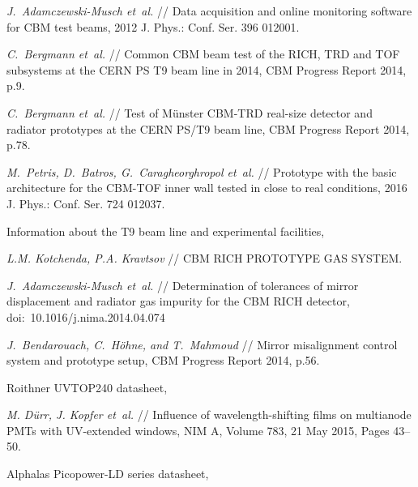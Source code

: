 \begin{thebibliography}{99}
\textit{J.~Adamczewski-Musch et~al.} //
Data acquisition and online monitoring software for CBM test beams,
2012 J. Phys.: Conf. Ser. 396 012001.

\textit{C.~Bergmann et~al.} //
Common CBM beam test of the RICH, TRD and TOF subsystems at the CERN PS T9 beam line in 2014,
CBM Progress Report 2014, p.9.

\textit{C.~Bergmann et~al.} //
Test of M\"unster CBM-TRD real-size detector and radiator prototypes at the CERN PS/T9 beam line,
CBM Progress Report 2014, p.78.

\textit{M.~Petris, D.~Batros, G.~Caragheorghropol et~al.} //
Prototype with the basic architecture for the CBM-TOF inner wall tested in close to real conditions,
2016 J. Phys.: Conf. Ser. 724 012037.

Information about the T9 beam line and experimental facilities,

\textit{L.M. Kotchenda, P.A. Kravtsov} //
CBM RICH PROTOTYPE GAS SYSTEM.

\textit{J.~Adamczewski-Musch et~al.} //
Determination of tolerances of mirror displacement and radiator gas impurity for the CBM RICH detector,
doi:~10.1016/j.nima.2014.04.074

\textit{J.~Bendarouach, C.~H\"{o}hne, and T.~Mahmoud} //
Mirror misalignment control system and prototype setup,
CBM Progress Report 2014, p.56.

Roithner UVTOP240 datasheet,

\textit{M. D\"{u}rr, J. Kopfer et~al.} //
Influence of wavelength-shifting films on multianode PMTs with UV-extended windows,
NIM A, Volume 783, 21 May 2015, Pages 43–50.

Alphalas Picopower-LD series datasheet,


\end{thebibliography}
